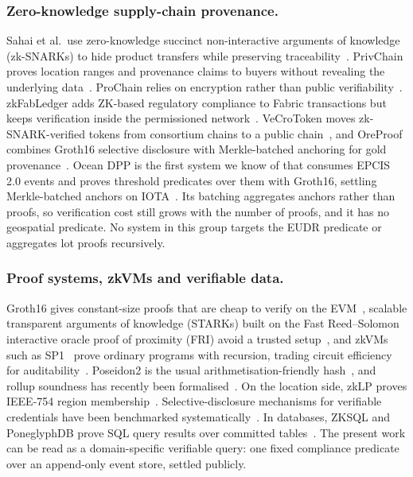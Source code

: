 \documentclass[runningheads]{llncs}
\newif\ifmarkrev
\newcommand{\rev}[1]{\ifmarkrev{\color{blue}#1}\else#1\fi}
\begin{document}
\subsubsection{Zero-knowledge supply-chain provenance.}
Sahai et al.\ use zero-knowledge succinct non-interactive arguments of knowledge (zk-SNARKs) to hide product transfers while preserving traceability~\cite{sahai2020zkp}. PrivChain proves location ranges and provenance claims to buyers without revealing the underlying data~\cite{malik2022privchain}. ProChain relies on encryption rather than public verifiability~\cite{li2024prochain}. zkFabLedger adds ZK-based regulatory compliance to Fabric transactions but keeps verification inside the permissioned network~\cite{yang2025zkfabledger}. VeCroToken moves zk-SNARK-verified tokens from consortium chains to a public chain~\cite{ding2026vecrotoken}, and OreProof combines Groth16 selective disclosure with Merkle-batched anchoring for gold provenance~\cite{hrabar2027oreproof}. \rev{Ocean DPP is the first system we know of that consumes EPCIS 2.0 events and proves threshold predicates over them with Groth16, settling Merkle-batched anchors on IOTA~\cite{khairy2026oceandpp}. Its batching aggregates anchors rather than proofs, so verification cost still grows with the number of proofs, and it has no geospatial predicate. No system in this group targets the EUDR predicate or aggregates lot proofs recursively.}

\subsubsection{Proof systems, zkVMs and verifiable data.}
Groth16 gives constant-size proofs that are cheap to verify on the EVM~\cite{groth2016}, scalable transparent arguments of knowledge (STARKs) built on the Fast Reed--Solomon interactive oracle proof of proximity (FRI) avoid a trusted setup~\cite{bensasson2018fri}, and zkVMs such as SP1~\cite{sp1} prove ordinary programs with recursion, trading circuit efficiency for auditability~\cite{yang2026sokzkvm}. Poseidon2 is the usual arithmetisation-friendly hash~\cite{grassi2023poseidon2}, and rollup soundness has recently been formalised~\cite{chaliasos2025rollups}. On the location side, zkLP proves IEEE-754 region membership~\cite{ernstberger2025zklp}. Selective-disclosure mechanisms for verifiable credentials have been benchmarked systematically~\cite{buldini2025sd}. In databases, ZKSQL and PoneglyphDB prove SQL query results over committed tables~\cite{li2023zksql,gu2025poneglyphdb}. The present work can be read as a domain-specific verifiable query: one fixed compliance predicate over an append-only event store, settled publicly.
\end{document}
